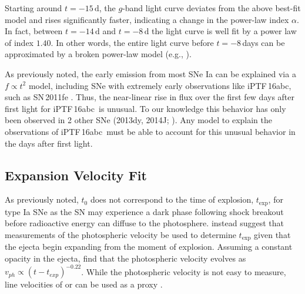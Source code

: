 \documentclass[twocolumn]{aastex61}
\newcommand{\abc}{iPTF\,16abc}
\newcommand{\amiller}[1]{{\color{blue} amiller: {#1}}}
\begin{document}
Starting around $t=-15\,\textrm{d}$, the $g$-band light curve 
deviates from the above best-fit model and 
rises significantly faster, indicating a
change in the power-law index $\alpha$. In fact, between $t=-14\,\mathrm{d}$ and $t=-8\,\mathrm{d}$ the light curve is well fit by a power law of index $1.40$. In other words, the entire light curve
before $t=-8$\,days can be approximated by a broken power-law model
(e.g.,
\citealt{2016arXiv161202097Z,
  2016arXiv161202725Z}).

As previously noted, the early emission from most SNe Ia can be explained via a $f \propto t^2$ model, including SNe with extremely early observations like \abc, such as SN\,2011fe \citep{2011Natur.480..344N}. Thus, the near-linear rise in flux over the first few days after first light for \abc\ is unusual. To our knowledge this behavior has only been observed in 2 other SNe (2013dy, 2014J; \citealt{2013ApJ...778L..15Z,2014ApJ...783L..24Z}). Any model to explain the observations of \abc\ must be able to account for this unusual behavior in the days after first light.  



\subsection{Expansion Velocity Fit}
\label{sec:early_vel}

As previously noted, $t_0$ does not correspond to the time of 
explosion, $t_\mathrm{exp}$, for type Ia SNe as the SN may 
experience a dark phase following shock breakout before radioactive 
energy can diffuse to the photosphere. \citet{2014ApJ...784...85P} 
instead suggest that measurements of the photospheric velocity be 
used to determine $t_\mathrm{exp}$ given that the ejecta begin 
expanding from the moment of explosion.  Assuming a
constant opacity in the ejecta, \citeauthor{2014ApJ...784...85P} 
find that the photospheric velocity evolves as
$v_{ph}\propto(t-t_{exp})^{-0.22}$. While the photospheric velocity
is not easy to measure, line velocities of  or 
can be used as a proxy
\citep{2014ApJ...784...85P,2016ApJ...826..144S}.
\end{document}

